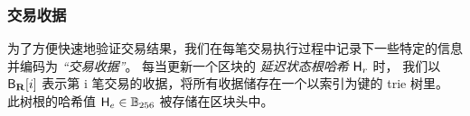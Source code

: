 \subsubsection{交易收据}

为了方便快速地验证交易结果，我们在每笔交易执行过程中记录下一些特定的信息并编码为 \emph{“交易收据”}。
每当更新一个区块的 \emph{延迟状态根哈希} $\textsf{H}_r$ 时，
我们以 $\textsf{B}_{\mathbf{R}}[i]$ 表示第 i 笔交易的收据，将所有收据储存在一个以索引为键的 trie 树里。
此树根的哈希值 $\textsf{H}_e\in\mathbb{B}_{256}$ 被存储在区块头中。

